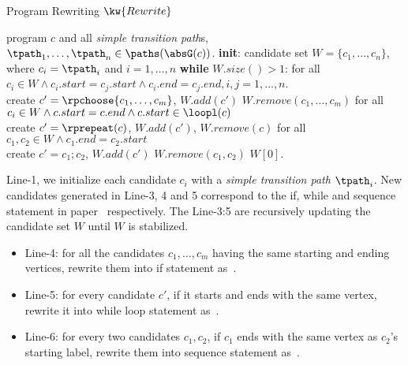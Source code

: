 {
\begin{algorithm}
\caption{Program Rewriting $\kw{Rewrite}$}
\label{alg:alg-refine_rewrite}
\begin{algorithmic}[1]
  \REQUIRE program $c$ and all \emph{simple transition path}s, $\tpath_1, \ldots, \tpath_n \in \paths(\absG(c))$.
  \STATE \textbf{init}: candidate set $W = \{c_1, \ldots, c_n\}$, where $c_i = \tpath_i$ and $i = 1, \ldots, n$
  \STATE \textbf{while} $W.size()> 1$:
  \STATE \quad 
  for all $c_i \in W \land c_i.start = c_j.start \land c_i.end = c_j.end, i, j = 1, \ldots, n$.
  \\ \quad create $c' = \rpchoose{c_1, \ldots, c_m}$, \qquad  $W.add(c')$ \qquad $W.remove(c_1, \ldots, c_m)$
  \STATE
  \quad for all $c_i \in W \land c.start = c.end \land c.start \in \loopl(c)$
  \\ \quad create $c' = \rprepeat(c)$, \qquad $W.add(c')$, \qquad $W.remove(c)$
  \STATE \quad for all $c_1, c_2 \in W \land c_1.end = c_2.start$
  \\
  \quad create $c' = c_1; c_2$, \quad $W.add(c')$ \qquad $W.remove(c_1, c_2)$
  \RETURN $W[0]$.
\end{algorithmic}
\end{algorithm}
}%
Line-1, we initialize each candidate $c_i$ with a \emph{simple transition path} $\tpath_i$. New candidates generated in Line-3, 4 and 5 correspond to the if,
while and sequence statement in paper~\cite{GulwaniJK09} respectively.
The Line-3:5 are recursively updating the candidate set $W$ until $W$ is stabilized.
\begin{itemize}
  \item
  Line-4: for all the candidates $c_1, \ldots, c_m$ having the same starting and ending vertices, rewrite them into if statement as~\cite{GulwaniJK09}.
  \item
  Line-5: for every candidate $c'$, if it starts and ends with the same vertex, rewrite it into while loop statement as~\cite{GulwaniJK09}.
  \item
  Line-6: for every two candidates $c_1, c_2$, if $c_1$ ends with the same vertex as $c_2$'s starting label, rewrite them into sequence statement as~\cite{GulwaniJK09}.
\end{itemize}
